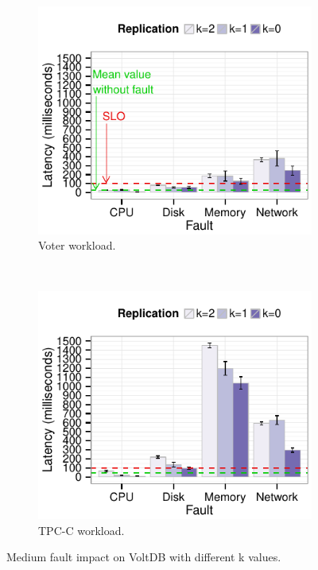 \begin{figure}
        \centering
        \begin{subfigure}[b]{0.48\textwidth}
               \includegraphics[width=1\textwidth]{inputs/img/k_factor_latency_99th_voltdb_k_analysis_voter}
                \caption{Voter workload.}
                \label{fig:k_factor_latency_99th_voltdb_k_analysis_voter}
        \end{subfigure}
        ~ %
        \begin{subfigure}[b]{0.48\textwidth}
                  \includegraphics[width=1\textwidth]{inputs/img/k_factor_latency_99th_voltdb_k_analysis_tpcc}
                \caption{TPC-C workload.}
                \label{fig:k_factor_latency_99th_voltdb_k_analysis_tpcc}
        \end{subfigure}
        \caption{Medium fault impact on VoltDB with different k values.}
         \label{fig:replication_degree_resiliency}

\end{figure}

